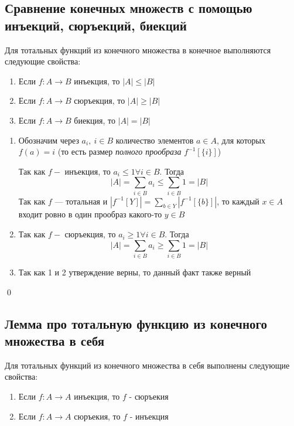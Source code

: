 \documentclass[a4paper]{article}
\begin{document}
\subsection{Сравнение конечных множеств с помощью инъекций, сюръекций, биекций}
\theorem Для тотальных функций из конечного множества в конечное выполняются следующие свойства:
\begin{enumerate}
    \item Если $f: A\rightarrow B$ инъекция, то $|A|\leqslant|B|$
    \item Если $f: A\rightarrow B$ сюръекция, то $|A|\geqslant|B|$
    \item Если $f: A\rightarrow B$ биекция, то $|A|=|B|$
\end{enumerate}

\proof
\begin{enumerate}
    \item Обозначим через $a_i,\ i\in B$ количество элементов $a\in A$, для которых $f(a)=i$ (то есть размер \textit{полного прообраза} $f^{-1}[\{i\}]$)
    
    Так как $f-$ инъекция, то $a_i\leqslant1\forall i\in B$. Тогда
    \begin{equation*}
        |A|=\sum\limits_{i\in B} a_i\leqslant\sum\limits_{i\in B} 1=|B|
    \end{equation*}
    Так как $f$ — тотальная и $|f^{-1}[Y]|=\sum\limits_{b\in Y} |f^{-1}[\{b\}]|$, то каждый $x\in A$ входит ровно в один прообраз какого-то $y\in B$
    
    \item Так как $f-$ сюръекция, то $a_i\geqslant1\forall i\in B$. Тогда
    \begin{equation*}
        |A|=\sum\limits_{i\in B} a_i\geqslant\sum\limits_{i\in B} 1=|B|
    \end{equation*}
     
    \item Так как 1 и 2 утверждение верны, то данный факт также верный
\end{enumerate}\qed

\subsection{Лемма про тотальную функцию из конечного множества в себя}
\theorem Для тотальных функций из конечного множества в себя выполнены следующие свойства:
\begin{enumerate}
    \item Если $f: A\rightarrow A$ инъекция, то $f$ - сюръекия
    \item Если $f: A\rightarrow A$ сюръекия, то $f$ - инъекция
\end{enumerate}
\end{document}
